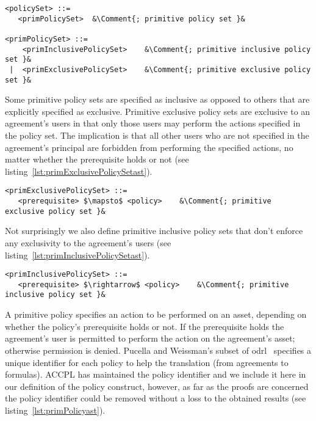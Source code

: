 \newcommand*{\Comment}[1]{\hfill\makebox[7.0cm][l]{#1}}%
\lstset{mathescape, language=AST, escapechar=\&}  
\begin{minipage}[c]{0.95\textwidth}
\begin{lstlisting}[frame=single, caption={policySet and primPolicySet},label={lst:policySetast}]
<policySet> ::=  
   <primPolicySet>	&\Comment{; primitive policy set }&
   
<primPolicySet> ::=  
    <primInclusivePolicySet>	&\Comment{; primitive inclusive policy set }&
 |  <primExclusivePolicySet>	&\Comment{; primitive exclusive policy set }&
\end{lstlisting}
\end{minipage}

Some primitive policy sets are specified as inclusive as opposed to others that are explicitly specified as exclusive. Primitive exclusive policy sets are exclusive to an agreement's users in that only those users may perform the actions specified in the policy set. The implication is that all other users who are not specified in the agreement's principal are forbidden from performing the specified actions, no matter whether the prerequisite holds or not (see listing~\ref{lst:primExclusivePolicySetast}).

\lstset{mathescape, language=AST, escapechar=\&}  
\begin{lstlisting}[frame=single, caption={primExclusivePolicySet},label={lst:primExclusivePolicySetast}]
<primExclusivePolicySet> ::=  
   <prerequisite> $\mapsto$ <policy>	&\Comment{; primitive exclusive policy set }&
\end{lstlisting}

Not surprisingly we also define primitive inclusive policy sets that don't enforce any exclusivity to the agreement's users (see listing~\ref{lst:primInclusivePolicySetast}).

\lstset{mathescape, language=AST, escapechar=\&}  
\begin{lstlisting}[frame=single, caption={primInclusivePolicySet},label={lst:primInclusivePolicySetast}]
<primInclusivePolicySet> ::=  
   <prerequisite> $\rightarrow$ <policy>	&\Comment{; primitive inclusive policy set }&
\end{lstlisting}


A primitive policy specifies an action to be performed on an asset, depending on whether the policy's prerequisite holds or not. If the prerequisite holds the agreement's user is permitted to perform the action on the agreement's asset; otherwise permission is denied. Pucella and Weissman's subset of \ac{odrl}~\cite{pucella2006} specifies a unique identifier for each policy to help the translation (from agreements to formulas). \ac{ACCPL} has maintained the policy identifier and we include it here in our definition of the policy construct, however, as far as the proofs are concerned the policy identifier could be removed without a loss to the obtained results (see listing~\ref{lst:primPolicyast}).

